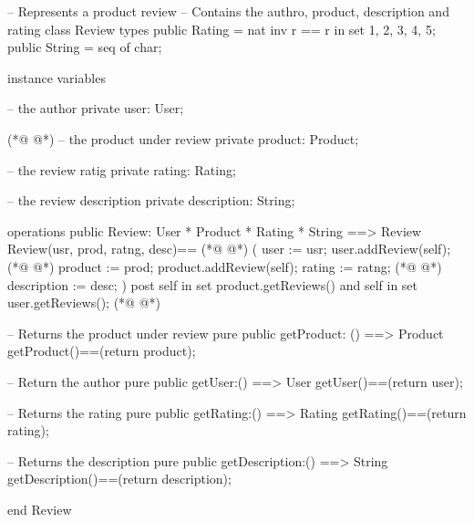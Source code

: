 \begin{vdmpp}[breaklines=true]
-- Represents a product review
-- Contains the authro, product, description and rating
class Review
 types
  public Rating = nat 
  inv r == r in set {1, 2, 3, 4, 5};
  public String = seq of char;

 instance variables
 
  -- the author
   private user: User;
   
(*@
\label{Review:14}
@*)
   -- the product under review
   private product: Product;
   
   -- the review ratig
  private rating: Rating;
  
  -- the review description
  private description: String;
  
 operations
  public Review: User * Product * Rating * String ==> Review
  Review(usr, prod, ratng, desc)==
(*@
\label{getProduct:26}
@*)
  (
   user := usr;
   user.addReview(self);
(*@
\label{getUser:29}
@*)
   product := prod;
   product.addReview(self);
   rating := ratng;
(*@
\label{getRating:32}
@*)
   description := desc;
  ) post self in set product.getReviews() and 
   self in set user.getReviews();
(*@
\label{getDescription:35}
@*)
 
  -- Returns the product under review
  pure public getProduct: () ==> Product
  getProduct()==(return product);
  
  -- Return the author
  pure public getUser:() ==> User
  getUser()==(return user);
  
  -- Returns the rating
  pure public getRating:() ==> Rating
  getRating()==(return rating);
  
  -- Returns the description
  pure public getDescription:() ==> String
  getDescription()==(return description);
 
end Review
\end{vdmpp}
